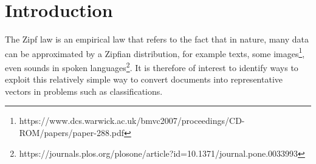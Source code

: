 \documentclass[\main/main.tex]{subfiles}
\begin{document}
\chapter{Introduction}
The Zipf law is an empirical law that refers to the fact that in nature, many data can be approximated by a Zipfian distribution, for example texts, some images\footnote{https://www.dcs.warwick.ac.uk/bmvc2007/proceedings/CD-ROM/papers/paper-288.pdf}, even sounds in spoken languages\footnote{https://journals.plos.org/plosone/article?id=10.1371/journal.pone.0033993}. It is therefore of interest to identify ways to exploit this relatively simple way to convert documents into representative vectors in problems such as classifications.
\end{document}
